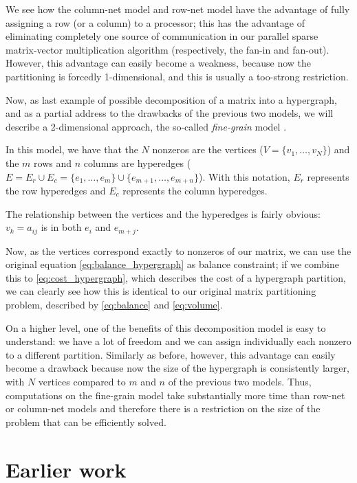 We see how the column-net model and row-net model have the advantage of fully assigning a row (or a column) to a processor; this has the advantage of eliminating completely one source of communication in our parallel sparse matrix-vector multiplication algorithm (respectively, the fan-in and fan-out). However, this advantage can easily become a weakness, because now the partitioning is forcedly 1-dimensional, and this is usually a too-strong restriction.

Now, as last example of possible decomposition of a matrix into a hypergraph, and as a partial address to the drawbacks of the previous two models, we will describe a 2-dimensional approach, the so-called \emph{fine-grain} model \cite{hypergraph_finegrain}.

In this model, we have that the $N$ nonzeros are the vertices ($V = \{ v_1,\dots,v_N\}$) and the $m$ rows and $n$ columns are hyperedges ($E = E_r \cup E_c = \{ e_1,\dots,e_m \} \cup \{e_{m+1},\dots,e_{m+n}\}$). With this notation, $E_r$ represents the row hyperedges and $E_c$ represents the column hyperedges.

The relationship between the vertices and the hyperedges is fairly obvious: $v_k = a_{ij}$ is in both $e_i$ and $e_{m+j}$.

Now, as the vertices correspond exactly to nonzeros of our matrix, we can use the original equation \eqref{eq:balance_hypergraph} as balance constraint; if we combine this to \eqref{eq:cost_hypergraph}, which describes the cost of a hypergraph partition, we can clearly see how this is identical to our original matrix partitioning problem, described by \eqref{eq:balance} and \eqref{eq:volume}.

On a higher level, one of the benefits of this decomposition model is easy to understand: we have a lot of freedom and we can assign individually each nonzero to a different partition. Similarly as before, however, this advantage can easily become a drawback because now the size of the hypergraph is consistently larger, with $N$ vertices compared to $m$ and $n$ of the previous two models. Thus, computations on the fine-grain model take substantially more time than row-net or column-net models and therefore there is a restriction on the size of the problem that can be efficiently solved.

\section{Earlier work}

